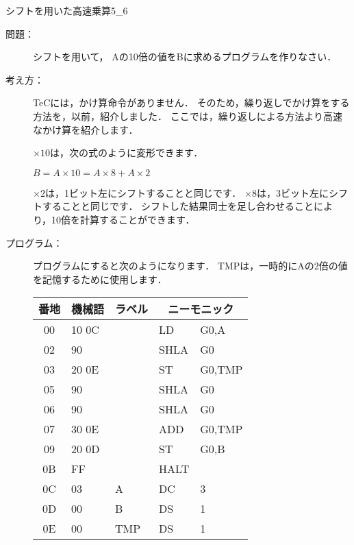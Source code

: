 \newpage
\begin{reidai}{シフトを用いた高速乗算}{5_6}
  \begin{description}
  \item[問題：] シフトを用いて，
    Aの10倍の値をBに求めるプログラムを作りなさい．

  \item[考え方：]
    TeCには，かけ算命令がありません．
    そのため，繰り返しでかけ算をする方法を，以前，紹介しました．
    ここでは，繰り返しによる方法より高速なかけ算を紹介します．

    $\times 10$は，次の式のように変形できます．

    \begin{center}
      $B = A \times 10 = A \times 8 + A \times 2$
    \end{center}

    $\times 2$は，1ビット左にシフトすることと同じです．
    $\times 8$は，3ビット左にシフトすることと同じです．
    シフトした結果同士を足し合わせることにより，10倍を計算することができます．

  \item[プログラム：]
    プログラムにすると次のようになります．
    TMPは，一時的にAの2倍の値を記憶するために使用します．

    {\ttfamily\small\begin{center}
      \begin{tabular}{|c|l|l|l l|} \hline
        番地 & 機械語 & ラベル & \multicolumn{2}{|c|}{ニーモニック} \\
        \hline
        00 & 10 0C &     & LD   & G0,A   \\
        02 & 90    &     & SHLA & G0     \\
        03 & 20 0E &     & ST   & G0,TMP \\
        05 & 90    &     & SHLA & G0     \\
        06 & 90    &     & SHLA & G0     \\
        07 & 30 0E &     & ADD  & G0,TMP \\
        09 & 20 0D &     & ST   & G0,B   \\
        0B & FF    &     & HALT &        \\
        0C & 03    & A   & DC   & 3      \\
        0D & 00    & B   & DS   & 1      \\
        0E & 00    & TMP & DS   & 1      \\
        \hline
      \end{tabular}
    \end{center}}

  \end{description}
\end{reidai}

